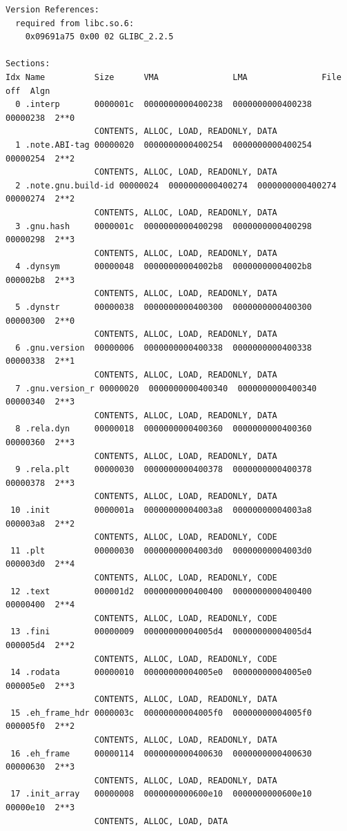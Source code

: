 \documentclass[11pt]{article}
\begin{document}
\begin{enumerate}
\begin{verbatim}
Version References:
  required from libc.so.6:
    0x09691a75 0x00 02 GLIBC_2.2.5

Sections:
Idx Name          Size      VMA               LMA               File off  Algn
  0 .interp       0000001c  0000000000400238  0000000000400238  00000238  2**0
                  CONTENTS, ALLOC, LOAD, READONLY, DATA
  1 .note.ABI-tag 00000020  0000000000400254  0000000000400254  00000254  2**2
                  CONTENTS, ALLOC, LOAD, READONLY, DATA
  2 .note.gnu.build-id 00000024  0000000000400274  0000000000400274  00000274  2**2
                  CONTENTS, ALLOC, LOAD, READONLY, DATA
  3 .gnu.hash     0000001c  0000000000400298  0000000000400298  00000298  2**3
                  CONTENTS, ALLOC, LOAD, READONLY, DATA
  4 .dynsym       00000048  00000000004002b8  00000000004002b8  000002b8  2**3
                  CONTENTS, ALLOC, LOAD, READONLY, DATA
  5 .dynstr       00000038  0000000000400300  0000000000400300  00000300  2**0
                  CONTENTS, ALLOC, LOAD, READONLY, DATA
  6 .gnu.version  00000006  0000000000400338  0000000000400338  00000338  2**1
                  CONTENTS, ALLOC, LOAD, READONLY, DATA
  7 .gnu.version_r 00000020  0000000000400340  0000000000400340  00000340  2**3
                  CONTENTS, ALLOC, LOAD, READONLY, DATA
  8 .rela.dyn     00000018  0000000000400360  0000000000400360  00000360  2**3
                  CONTENTS, ALLOC, LOAD, READONLY, DATA
  9 .rela.plt     00000030  0000000000400378  0000000000400378  00000378  2**3
                  CONTENTS, ALLOC, LOAD, READONLY, DATA
 10 .init         0000001a  00000000004003a8  00000000004003a8  000003a8  2**2
                  CONTENTS, ALLOC, LOAD, READONLY, CODE
 11 .plt          00000030  00000000004003d0  00000000004003d0  000003d0  2**4
                  CONTENTS, ALLOC, LOAD, READONLY, CODE
 12 .text         000001d2  0000000000400400  0000000000400400  00000400  2**4
                  CONTENTS, ALLOC, LOAD, READONLY, CODE
 13 .fini         00000009  00000000004005d4  00000000004005d4  000005d4  2**2
                  CONTENTS, ALLOC, LOAD, READONLY, CODE
 14 .rodata       00000010  00000000004005e0  00000000004005e0  000005e0  2**3
                  CONTENTS, ALLOC, LOAD, READONLY, DATA
 15 .eh_frame_hdr 0000003c  00000000004005f0  00000000004005f0  000005f0  2**2
                  CONTENTS, ALLOC, LOAD, READONLY, DATA
 16 .eh_frame     00000114  0000000000400630  0000000000400630  00000630  2**3
                  CONTENTS, ALLOC, LOAD, READONLY, DATA
 17 .init_array   00000008  0000000000600e10  0000000000600e10  00000e10  2**3
                  CONTENTS, ALLOC, LOAD, DATA

\end{verbatim}
\end{enumerate}
\end{document}
